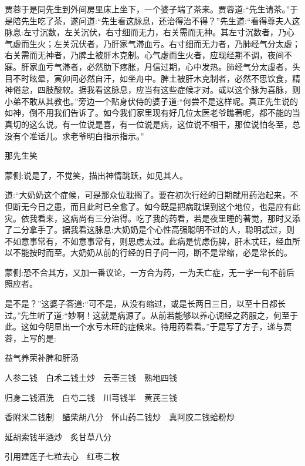 \begin{parag}
    贾蓉于是同先生到外间房里床上坐下，一个婆子端了茶来。贾蓉道:“先生请茶。”于是陪先生吃了茶，遂问道:“先生看这脉息，还治得治不得？”先生道:“看得尊夫人这脉息:左寸沉数，左关沉伏，右寸细而无力，右关需而无神。其左寸沉数者，乃心气虚而生火；左关沉伏者，乃肝家气滞血亏。右寸细而无力者，乃肺经气分太虚；右关需而无神者，乃脾土被肝木克制。心气虚而生火者，应现经期不调，夜间不寐。肝家血亏气滞者，必然肋下疼胀，月信过期，心中发热。肺经气分太虚者，头目不时眩晕，寅卯间必然自汗，如坐舟中。脾土被肝木克制者，必然不思饮食，精神倦怠，四肢酸软。据我看这脉息，应当有这些症候才对。或以这个脉为喜脉，则小弟不敢从其教也。”旁边一个贴身伏侍的婆子道:“何尝不是这样呢。真正先生说的如神，倒不用我们告诉了。如今我们家里现有好几位太医老爷瞧著呢，都不能的当真切的这么说。有一位说是喜，有一位说是病，这位说不相干，那位说怕冬至，总没有个准话儿。求老爷明白指示指示。”
\end{parag}


\begin{parag}
    那先生笑\begin{note}蒙侧:说是了，不觉笑，描出神情跳跃，如见其人。\end{note}道:“大奶奶这个症候，可是那众位耽搁了。要在初次行经的日期就用药治起来，不但断无今日之患，而且此时已全愈了。如今既是把病耽误到这个地位，也是应有此灾。依我看来，这病尚有三分治得。吃了我的药看，若是夜里睡的著觉，那时又添了二分拿手了。据我看这脉息:大奶奶是个心性高强聪明不过的人，聪明忒过，则不如意事常有，不如意事常有，则思虑太过。此病是忧虑伤脾，肝木忒旺，经血所以不能按时而至。大奶奶从前的行经的日子问一问，断不是常缩，必是常长的。\begin{note}蒙侧:恐不合其方，又加一番议论，一方合为药，一为夭亡症，无一字一句不前后照应者。\end{note}是不是？”这婆子答道:“可不是，从没有缩过，或是长两日三日，以至十日都长过。”先生听了道:“妙啊！这就是病源了。从前若能够以养心调经之药服之，何至于此。这如今明显出一个水亏木旺的症候来。待用药看看。”于是写了方子，递与贾蓉，上写的是:
\end{parag}


\begin{qute2sp}
    益气养荣补脾和肝汤


    人参二钱　白术二钱土炒　云苓三钱　熟地四钱


    归身二钱酒洗　白芍二钱　川芎钱半　黄芪三钱


    香附米二钱制　醋柴胡八分　怀山药二钱炒　真阿胶二钱蛤粉炒


    延胡索钱半酒炒　炙甘草八分


    引用建莲子七粒去心　红枣二枚
\end{qute2sp}


